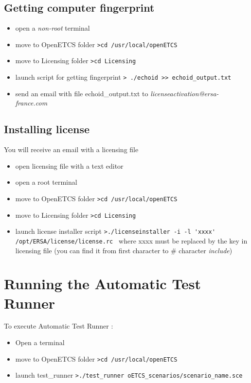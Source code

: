 \documentclass{template/openetcs_article}
\begin{document}
\subsection{Getting computer fingerprint}
\begin{itemize}
	\item open a \emph{non-root} terminal
	\item move to OpenETCS folder
	\newline
	\verb|>cd /usr/local/openETCS |	
	\item move to Licensing folder
	\newline
	\verb|>cd Licensing |
	\item launch script for getting fingerprint
	\newline
	\verb|> ./echoid >> echoid_output.txt|	
	\item send an email with file echoid\_output.txt to \emph{licenseactivation@ersa-france.com}
\end{itemize}
\subsection{Installing license}
You will receive an email with a licensing file
\begin{itemize}
	\item open licensing file with a text editor
	\item open a root terminal
	\item move to OpenETCS folder
	\newline
	\verb|>cd /usr/local/openETCS |	
	\item move to Licensing folder
	\newline
	\verb|>cd Licensing |
	\item launch license installer script
	\newline
	\verb|>./licenseinstaller -i -l 'xxxx' /opt/ERSA/license/license.rc |	where xxxx must be replaced by the key in licensing file (you can find it from first character to \# character \emph{include})
\end{itemize}
\newpage
\section{Running the Automatic Test Runner}
To execute Automatic Test Runner : 
\begin{itemize}
	\item Open a terminal
	\item move to OpenETCS folder
	\newline
	\verb|>cd /usr/local/openETCS |		
	\item launch test\_runner
	\newline
	\verb|>./test_runner oETCS_scenarios/scenario_name.sce |	
\end{itemize}


\end{document}
